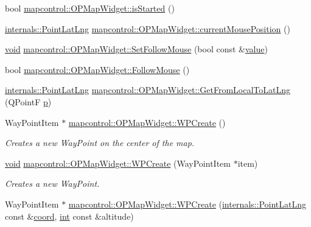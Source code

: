 \begin{DoxyCompactItemize}
\item 
bool \hyperlink{group___o_p_map_widget_ga1a79fb1b73da4c902626f6dcee9fa372}{mapcontrol\-::\-O\-P\-Map\-Widget\-::is\-Started} ()
\item 
\hyperlink{structinternals_1_1_point_lat_lng}{internals\-::\-Point\-Lat\-Lng} \hyperlink{group___o_p_map_widget_gabb9370f367fc42a3987983e79db0828a}{mapcontrol\-::\-O\-P\-Map\-Widget\-::current\-Mouse\-Position} ()
\item 
\hyperlink{group___u_a_v_objects_plugin_ga444cf2ff3f0ecbe028adce838d373f5c}{void} \hyperlink{group___o_p_map_widget_ga9713d4bd6a80debb60fbb66d3e55ebd3}{mapcontrol\-::\-O\-P\-Map\-Widget\-::\-Set\-Follow\-Mouse} (bool const \&\hyperlink{glext_8h_aa0e2e9cea7f208d28acda0480144beb0}{value})
\item 
bool \hyperlink{group___o_p_map_widget_gab4d31649441240def7d389c4d814c6a2}{mapcontrol\-::\-O\-P\-Map\-Widget\-::\-Follow\-Mouse} ()
\item 
\hyperlink{structinternals_1_1_point_lat_lng}{internals\-::\-Point\-Lat\-Lng} \hyperlink{group___o_p_map_widget_ga350ef32ca621e11b3d5a2d3fe4aeaca6}{mapcontrol\-::\-O\-P\-Map\-Widget\-::\-Get\-From\-Local\-To\-Lat\-Lng} (Q\-Point\-F \hyperlink{glext_8h_aa5367c14d90f462230c2611b81b41d23}{p})
\item 
Way\-Point\-Item $\ast$ \hyperlink{group___o_p_map_widget_ga7a23e7347fa5504a5af7d58e66161fa2}{mapcontrol\-::\-O\-P\-Map\-Widget\-::\-W\-P\-Create} ()
\begin{DoxyCompactList}\small\item\em Creates a new Way\-Point on the center of the map. \end{DoxyCompactList}\item 
\hyperlink{group___u_a_v_objects_plugin_ga444cf2ff3f0ecbe028adce838d373f5c}{void} \hyperlink{group___o_p_map_widget_gaf4409d0e8417e7cce528af31cef4dfe4}{mapcontrol\-::\-O\-P\-Map\-Widget\-::\-W\-P\-Create} (Way\-Point\-Item $\ast$item)
\begin{DoxyCompactList}\small\item\em Creates a new Way\-Point. \end{DoxyCompactList}\item 
Way\-Point\-Item $\ast$ \hyperlink{group___o_p_map_widget_gac17ec2fbbcf0065570ad8d8568729521}{mapcontrol\-::\-O\-P\-Map\-Widget\-::\-W\-P\-Create} (\hyperlink{structinternals_1_1_point_lat_lng}{internals\-::\-Point\-Lat\-Lng} const \&\hyperlink{glext_8h_a4ad6f000813afde2b5727cbfdddc75be}{coord}, \hyperlink{ioapi_8h_a787fa3cf048117ba7123753c1e74fcd6}{int} const \&altitude)

\end{DoxyCompactItemize}
